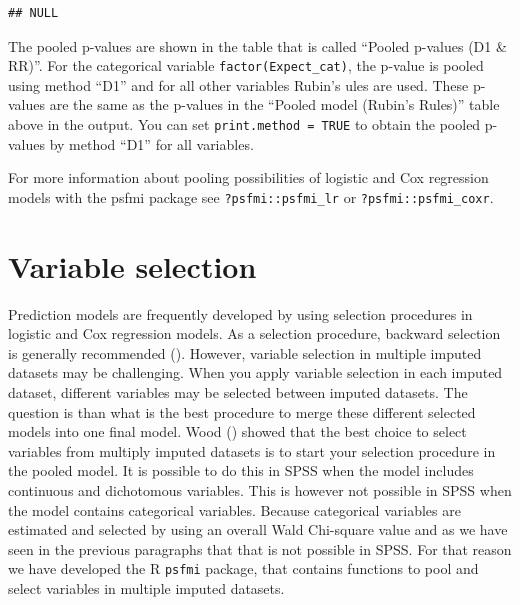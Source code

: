\documentclass[
]{book}
\newenvironment{Shaded}{\begin{snugshade}}{\end{snugshade}}
\newcommand{\NormalTok}[1]{#1}
\newcommand{\OperatorTok}[1]{\textcolor[rgb]{0.81,0.36,0.00}{\textbf{#1}}}
\begin{document}
\begin{Shaded}
\end{Shaded}

\begin{verbatim}
## NULL
\end{verbatim}

The pooled p-values are shown in the table that is called ``Pooled p-values (D1 \& RR)''. For the categorical variable \texttt{factor(Expect\_cat)}, the p-value is pooled using method ``D1'' and for all other variables Rubin's ules are used. These p-values are the same as the p-values in the ``Pooled model (Rubin's Rules)'' table above in the output. You can set \texttt{print.method\ =\ TRUE} to obtain the pooled p-values by method ``D1'' for all variables.

For more information about pooling possibilities of logistic and Cox regression models with the psfmi package see \texttt{?psfmi::psfmi\_lr} or \texttt{?psfmi::psfmi\_coxr}.

\hypertarget{variable-selection}{%
\section{Variable selection}\label{variable-selection}}

Prediction models are frequently developed by using selection procedures in logistic and Cox regression models. As a selection procedure, backward selection is generally recommended (\citet{Moons2015}). However, variable selection in multiple imputed datasets may be challenging. When you apply variable selection in each imputed dataset, different variables may be selected between imputed datasets. The question is than what is the best procedure to merge these different selected models into one final model. Wood (\citet{Wood2008}) showed that the best choice to select variables from multiply imputed datasets is to start your selection procedure in the pooled model. It is possible to do this in SPSS when the model includes continuous and dichotomous variables. This is however not possible in SPSS when the model contains categorical variables. Because categorical variables are estimated and selected by using an overall Wald Chi-square value and as we have seen in the previous paragraphs that that is not possible in SPSS. For that reason we have developed the R \texttt{psfmi} package, that contains functions to pool and select variables in multiple imputed datasets.
\end{document}
